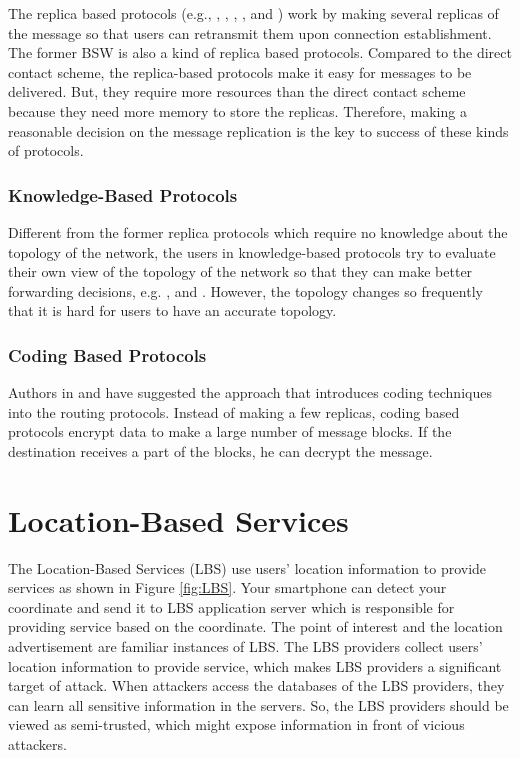 \noindent The replica based protocols (e.g., \cite{C6}, \cite{C7}, \cite{C8}, \cite{C9}, and \cite{C37}) work by making several replicas of the message so that users can retransmit them upon connection establishment. The former BSW is also a kind of replica based protocols. Compared to the direct contact scheme, the replica-based protocols make it easy for messages to be delivered. But, they require more resources than the direct contact scheme because they need more memory to store the replicas. Therefore, making a reasonable decision on the message replication is the key to success of these kinds of protocols.


\subsubsection{  Knowledge-Based Protocols}

\noindent Different from the former replica protocols which require no knowledge about the topology of the network, the users in knowledge-based protocols try to evaluate their own view of the topology of the network so that they can make better forwarding decisions, e.g. \cite{C36}, \cite{C38} and \cite{C39}. However, the topology changes so frequently that it is hard for users to have an accurate topology.


\subsubsection{ Coding Based Protocols}

\noindent Authors in \cite {C12} and \cite {C13} have suggested the approach that introduces coding techniques into the routing protocols. Instead of making a few replicas, coding based protocols encrypt data to make a large number of message blocks. If the destination receives a part of the blocks, he can decrypt the message.

\section{ Location-Based Services}

\noindent The Location-Based Services (LBS) use users' location information to provide services as shown in Figure \ref{fig:LBS}. Your smartphone can detect your coordinate and send it to LBS application server which is responsible for providing service based on the coordinate. The point of interest and the location advertisement are familiar instances of LBS. The LBS providers collect users' location information to provide service, which makes LBS providers a significant target of attack. When attackers access the databases of the LBS providers, they can learn all sensitive information in the servers. So, the LBS providers should be viewed as semi-trusted, which might expose information in front of vicious attackers.

